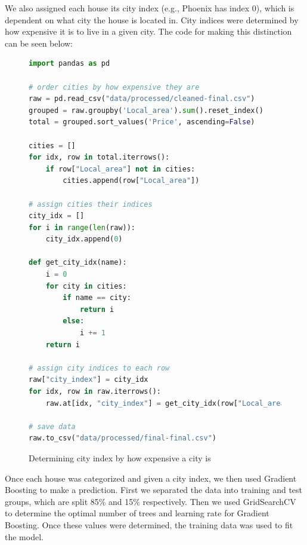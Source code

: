 \documentclass[12pt]{article}
\begin{document}
We also assigned each house its city index (e.g., Phoenix has index 0), which is dependent on what city the house is located in.
City indices were determined by how expensive it is to live in a given city.
The code for making this distinction can be seen below:
 \begin{figure}[H]
    \centering
    \begin{lstlisting}[language=Python]
import pandas as pd

# order cities by how expensive they are
raw = pd.read_csv("data/processed/cleaned-final.csv")
grouped = raw.groupby('Local_area').sum().reset_index()
total = grouped.sort_values('Price', ascending=False)

cities = []
for idx, row in total.iterrows():
    if row["Local_area"] not in cities:
        cities.append(row["Local_area"])

# assign cities their indices
city_idx = []
for i in range(len(raw)):
    city_idx.append(0)

def get_city_idx(name):
    i = 0
    for city in cities:
        if name == city:
            return i
        else:
            i += 1
    return i

# assign city indices to each row
raw["city_index"] = city_idx
for idx, row in raw.iterrows():
    raw.at[idx, "city_index"] = get_city_idx(row["Local_area"])

# save data
raw.to_csv("data/processed/final-final.csv")

    \end{lstlisting}
    \caption{Determining city index by how expensive a city is}
    \label{fig:cityidx}
\end{figure}
Once each house was categorized and given a city index, we then used Gradient Boosting to make a prediction.
First we separated the data into training and test groups, which are split 85\% and 15\% respectively.
Then we used GridSearchCV to determine the optimal number of trees and learning rate for Gradient Boosting.
Once these values were determined, the training data was used to fit the model.
\end{document}

